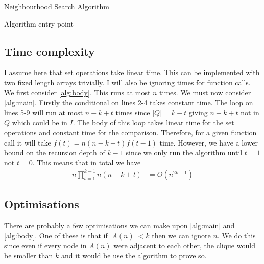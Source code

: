 \documentclass[11pt]{article}
\begin{document}
\begin{algorithm}
\caption{Neighbourhood Search Algorithm}\label{alg:main}
\end{algorithm}

\begin{algorithm}
\caption{Algorithm entry point}\label{alg:body}
\end{algorithm}

\subsection{Time complexity}

I assume here that set operations take linear time. This can be implemented with two fixed length arrays trivially. I will also be ignoring times for function calls.\\

We first consider \cref{alg:body}. This runs at most $n$ times. We must now consider \cref{alg:main}. Firstly the conditional on lines 2-4 takes constant time. The loop on lines 5-9 will run at most $n-k+t$ times since $|Q|=k-t$ giving $n-k+t$ not in $Q$ which could be in $I$. The body of this loop takes linear time for the set operations and constant time for the comparison. Therefore, for a given function call it will take $f(t)=n(n-k+t)f(t-1)$ time. However, we have a lower bound on the recursion depth of $k-1$ since we only run the algorithm until $t=1$ not $t=0$. This means that in total we have
\begin{equation}
	\begin{aligned}
		n\prod_{t=1}^{k-1}n(n-k+t)&=O(n^{2k-1})
	\end{aligned}
\end{equation}

\subsection{Optimisations}
\label{subsec:optimisations}

There are probably a few optimisations we can make upon \cref{alg:main} and \cref{alg:body}. One of these is that if $|A(n)|<k$ then we can ignore $n$. We do this since even if every node in $A(n)$ were adjacent to each other, the clique would be smaller than $k$ and it would be use the algorithm to prove so.
\end{document}
